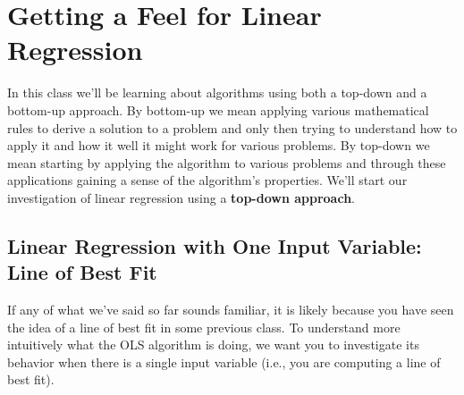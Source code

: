 \documentclass[assignment01_Solutions]{subfiles}
\begin{document}
\section{Getting a Feel for Linear Regression}
In this class we'll be learning about algorithms using both a top-down and a bottom-up approach.  By bottom-up we mean applying various mathematical rules to derive a solution to a problem and only then trying to understand how to apply it and how it well it might work for various problems.  By top-down we mean starting by applying the algorithm to various problems and through these applications gaining a sense of the algorithm's properties.  We'll start our investigation of linear regression using a \textbf{top-down approach}.


\subsection{Linear Regression with One Input Variable: Line of Best Fit}
If any of what we've said so far sounds familiar, it is likely because you have seen the idea of a line of best fit in some previous class.  To understand more intuitively what the OLS algorithm is doing, we want you to investigate its behavior when there is a single input variable (i.e., you are computing a line of best fit).  
\end{document}
